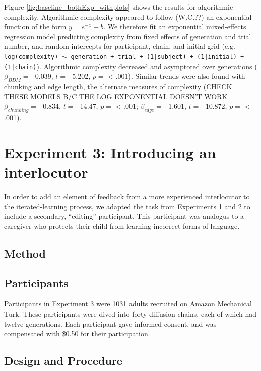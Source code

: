 \documentclass[10pt, letterpaper]{article}
\begin{document}
Figure \ref{fig:baseline_bothExp_withplots} shows the results for
algorithmic complexity. Algorithmic complexity appeared to follow
(W.C.??) an exponential function of the form \(y = e^{-x} + b\). We
therefore fit an exponential mixed-effects regression model predicting
complexity from fixed effects of generation and trial number, and random
intercepts for participant, chain, and initial grid (e.g.
\texttt{log(complexity) $\sim$ generation + trial + (1|subject) + (1|initial) + (1|chain)}).
Algorithmic complexity decreased and asymptoted over generations
(\(\beta_{BDM} =\) -0.039, \(t =\) -5.202, \(p =\) \textless{} .001).
Similar trends were also found with chunking and edge length, the
alternate measures of complexity (CHECK THESE MODELS B/C THE LOG
EXPONENTIAL DOESN'T WORK \(\beta_{chunking} =\) -0.834, \(t =\) -14.47,
\(p =\) \textless{} .001; \(\beta_{edge} =\) -1.601, \(t =\) -10.872,
\(p =\) \textless{} .001).

\section{Experiment 3: Introducing an
interlocutor}\label{experiment-3-introducing-an-interlocutor}

In order to add an element of feedback from a more experienced
interlocutor to the iterated-learning process, we adapted the task from
Experiments 1 and 2 to include a secondary, ``editing'' participant.
This participant was analogus to a caregiver who protects their child
from learning incorrect forms of language.

\subsection{Method}\label{method-2}

\subsection{Participants}\label{participants-2}

Participants in Experiment 3 were 1031 adults recruited on Amazon
Mechanical Turk. These participants were dived into forty diffusion
chains, each of which had twelve generations. Each participant gave
informed consent, and was compensated with \$0.50 for their
participation.

\subsection{Design and Procedure}\label{design-and-procedure-2}
\end{document}
